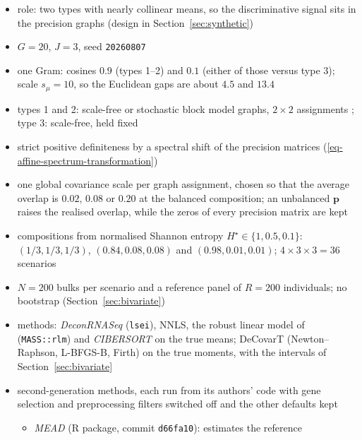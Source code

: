 \documentclass[pdflatex, sn-nature]{sn-jnl}
\theoremstyle{thmstyleone}%
\theoremstyle{thmstyletwo}%
\theoremstyle{thmstylethree}%
\begin{document}
\begin{itemize}
  \item role: two types with nearly collinear means, so the discriminative signal sits in
        the precision graphs (design in Section~\ref{sec:synthetic})
  \item \(G=20\), \(J=3\), seed \texttt{20260807}
  \item one Gram: cosines \(0.9\) (types 1--2) and \(0.1\) (either of those versus type 3);
        scale \(s_{\mu}=10\), so the Euclidean gaps are about \(4.5\) and \(13.4\)
  \item types 1 and 2: scale-free or stochastic block model graphs, \(2\times 2\) assignments
        \cite{barabasiEmergenceScalingRandom1999,hollandStochasticBlockmodelsFirst1983};
        type 3: scale-free, held fixed
  \item strict positive definiteness by a spectral shift of the precision matrices
        (\ref{eq-affine-spectrum-transformation}) \cite{chiquetVariationalInferenceSparse2018}
  \item one global covariance scale per graph assignment, chosen so that the average overlap is \(0.02\), \(0.08\) or
        \(0.20\) at the balanced composition; an unbalanced \(\boldsymbol{p}\) raises the realised overlap, while the zeros
        of every precision matrix are kept
  \item compositions from normalised Shannon entropy \(H^{\star}\in\{1,0.5,0.1\}\):
        \((1/3,1/3,1/3)\), \((0.84,0.08,0.08)\) and \((0.98,0.01,0.01)\);
        \(4\times3\times3=36\) scenarios
  \item \(N=200\) bulks per scenario and a reference panel of \(R=200\) individuals; no bootstrap
        (Section~\ref{sec:bivariate})
  \item methods: \emph{DeconRNASeq} (\texttt{lsei}), NNLS, the robust linear model of \cite{monacoRNASeqSignaturesNormalized2019}
        (\texttt{MASS::rlm}) and \emph{CIBERSORT} \cite{newmanRobustEnumerationCell2015} on the true means; DeCovarT (Newton--Raphson, L-BFGS-B, Firth) on the true moments, with the intervals of
        Section~\ref{sec:bivariate}
  \item second-generation methods, each run from its authors' code with gene selection and preprocessing filters
        switched off and the other defaults kept
  \begin{itemize}
    \item \emph{MEAD} \cite{xieStatisticalInferenceCell2026} (R package, commit \texttt{d66fa10}): estimates the reference

\end{itemize}
\end{itemize}
\end{document}
